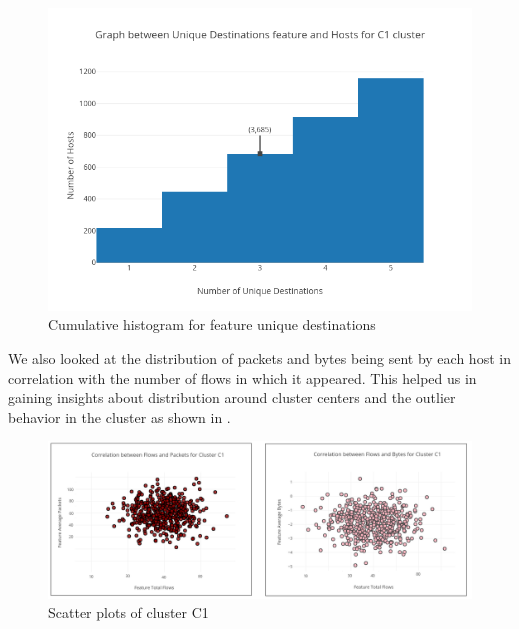 \begin{figure}[t]
	\centerline{
		\includegraphics[scale = 1.0]{cumulative_histogram.png}
	}
		\caption{Cumulative histogram for feature unique destinations}%
\end{figure}

We also looked at the distribution of packets and bytes being sent by each host in correlation with the number of flows in which it appeared. This helped us in gaining insights about distribution around cluster centers and the outlier behavior in the cluster as shown in .  

\begin{figure}[b]
	\centerline{
		\includegraphics[scale = 0.6]{c1_packets.png}
	}
	\caption{Scatter plots of cluster C1}%
\end{figure}


